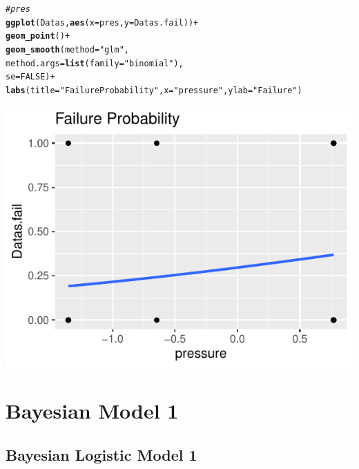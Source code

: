 \documentclass[11pt,english]{article}\usepackage[]{graphicx}\usepackage[]{xcolor}
\makeatletter
\def\maxwidth{ %
  \ifdim\Gin@nat@width>\linewidth
    \linewidth
  \else
    \Gin@nat@width
  \fi
}
\newcommand{\hlnum}[1]{\textcolor[rgb]{0.686,0.059,0.569}{#1}}%
\newcommand{\hlstr}[1]{\textcolor[rgb]{0.192,0.494,0.8}{#1}}%
\newcommand{\hlcom}[1]{\textcolor[rgb]{0.678,0.584,0.686}{\textit{#1}}}%
\newcommand{\hlopt}[1]{\textcolor[rgb]{0,0,0}{#1}}%
\newcommand{\hlstd}[1]{\textcolor[rgb]{0.345,0.345,0.345}{#1}}%
\newcommand{\hlkwc}[1]{\textcolor[rgb]{0.333,0.667,0.333}{#1}}%
\newcommand{\hlkwd}[1]{\textcolor[rgb]{0.737,0.353,0.396}{\textbf{#1}}}%
\newenvironment{kframe}{%
 \def\at@end@of@kframe{}%
 \ifinner\ifhmode%
  \def\at@end@of@kframe{\end{minipage}}%
  \begin{minipage}{\columnwidth}%
 \fi\fi%
 \def\FrameCommand##1{\hskip\@totalleftmargin \hskip-\fboxsep
 \colorbox{shadecolor}{##1}\hskip-\fboxsep
     \hskip-\linewidth \hskip-\@totalleftmargin \hskip\columnwidth}%
 \MakeFramed {\advance\hsize-\width
   \@totalleftmargin\z@ \linewidth\hsize
   \@setminipage}}%
 {\par\unskip\endMakeFramed%
 \at@end@of@kframe}
\newenvironment{knitrout}{}{} %
\makeatother
\begin{document}
\begin{center}
\begin{knitrout}
\color{fgcolor}\begin{kframe}
\begin{alltt}
\hlcom{# pres}
\hlkwd{ggplot}\hlstd{( Datas,} \hlkwd{aes}\hlstd{(}\hlkwc{x}\hlstd{=pres,} \hlkwc{y}\hlstd{=Datas.fail))} \hlopt{+}
  \hlkwd{geom_point}\hlstd{()} \hlopt{+}
  \hlkwd{geom_smooth}\hlstd{(}\hlkwc{method} \hlstd{=} \hlstr{"glm"}\hlstd{,}
              \hlkwc{method.args} \hlstd{=} \hlkwd{list}\hlstd{(}\hlkwc{family} \hlstd{=} \hlstr{"binomial"}\hlstd{),}
              \hlkwc{se} \hlstd{=} \hlnum{FALSE}\hlstd{)} \hlopt{+}
\hlkwd{labs}\hlstd{(}\hlkwc{title} \hlstd{=} \hlstr{"Failure Probability"}\hlstd{,}\hlkwc{x} \hlstd{=} \hlstr{"pressure"}\hlstd{,}\hlkwc{ylab} \hlstd{=} \hlstr{"Failure"}\hlstd{)}
\end{alltt}
\end{kframe}
\includegraphics[width=\maxwidth]{figure/unnamed-chunk-5-1} 
\end{knitrout}
\par\end{center}
\author{\pagebreak}

\section*{Bayesian Model 1}

\subsection*{Bayesian Logistic Model 1}
\end{document}
